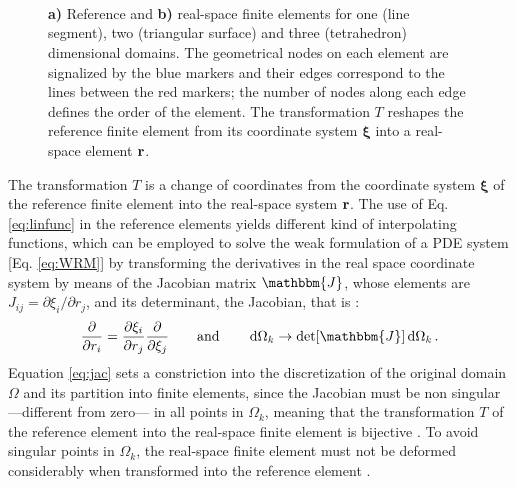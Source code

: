  \begin{figure}[h!]
    \centering
    \small
        \def\svgwidth{.8\textwidth}
        \vspace*{-15em}\\
    \hspace*{-.8\textwidth}
        \begin{subfigure}{\textwidth}\caption{ }\label{fig:FinEleEx:a}\end{subfigure}
        \vspace*{5em}\\
    \hspace*{-.8\textwidth}
        \begin{subfigure}{\textwidth}\caption{ }\label{fig:FinEleEx:b}\end{subfigure}
    \vspace*{6em}\\
 \caption[References an Real-space Finite Elements]{ \textbf{a)} Reference and \textbf{b)} real-space finite elements for one (line segment), two (triangular surface) and three (tetrahedron) dimensional domains. The geometrical nodes on each element are signalized by the blue markers and their edges correspond to the lines between the red markers; the number of nodes along each edge defines the order of the element. The transformation $T$ reshapes the reference finite element from its coordinate system $\boldsymbol{\xi}$ into a real-space element $\vb{r}$. }
\label{fig:FinEleEx}
\end{figure}

The transformation $T$ is a change of coordinates from the coordinate system $\boldsymbol{\xi}$  of the reference finite element into the real-space system $\vb{r}$. The use of Eq. \eqref{eq:linfunc} in the reference elements yields different kind of interpolating functions, which can be employed to solve the weak formulation of a PDE system [Eq. \eqref{eq:WRM}] by transforming the derivatives in the real space coordinate system by means of the Jacobian matrix $\mathbbm{J}$, whose elements are $J_{ij} = \partial \xi_i/\partial r_j$, and its determinant, the Jacobian, that is \cite{dhatt_finite_2012,fletcher_computational_1984}:
%
\begin{align}
    \pdv{r_i} = \pdv{\xi_i}{r_j} \pdv{\xi_j}
    \qquad
    \text{and}
    \qquad
    \dd{\Omega_k} \to \det[\mathbbm{J}]\dd{\Omega_k}.
\label{eq:jac}
\end{align}
%
Equation \eqref{eq:jac} sets a constriction into the discretization of the original domain $\Omega$ and its partition into finite elements, since the Jacobian must be non singular ---different from zero--- in all points in $\Omega_k$, meaning that the transformation $T$ of the reference element into the real-space finite element is bijective \cite{dhatt_finite_2012,fletcher_computational_1984}. To avoid singular points in $\Omega_k$, the real-space finite element must not be deformed considerably when transformed into the reference element \cite{dhatt_finite_2012}.

